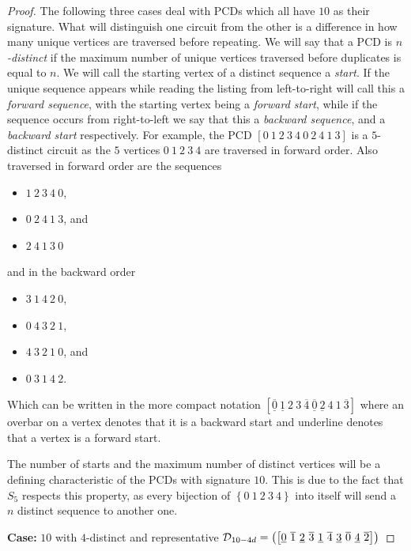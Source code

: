 \begin{proof}
The following three cases deal with PCDs which all have $10$ as their signature. What will distinguish one circuit from the other is a difference in how many unique vertices are traversed before repeating. We will say that a PCD is {\em  $n$-distinct} if the maximum number of unique vertices traversed before duplicates is equal to $n$. We will call the starting vertex of a distinct sequence a {\em start}. If the unique sequence appears while reading the listing from left-to-right will call this a {\em forward sequence}, with the starting vertex being a {\em forward start}, while if the sequence occurs from right-to-left we say that this a {\em backward sequence}, and a {\em backward start} respectively. For example, the PCD $\left[0\ 1\ 2\ 3\ 4\ 0\ 2\ 4\ 1\ 3 \right]$ is a $5$-distinct circuit as the $5$ vertices $0\ 1\ 2\ 3\ 4$ are traversed in forward order. Also traversed in forward order are the sequences 
\begin{itemize}
\item $1\ 2\ 3\ 4\ 0$,
\item $0\ 2\ 4\ 1\ 3$, and 
\item $2\ 4\ 1\ 3\ 0$
\end{itemize}
\noindent
and in the backward order
\begin{itemize}
\item $3\ 1\ 4\ 2\ 0$, 
\item $0\ 4\ 3\ 2\ 1$,
\item $4\ 3\ 2\ 1\ 0$, and
\item $0\ 3\ 1\ 4\ 2$.
\end{itemize}
\noindent
Which can be written in the more compact notation $\left[\overline{\underline{0}}\ \underline{1}\ 2\ 3\ \overline{4}\ \overline{\underline{0}}\ \underline{2}\ 4\ 1\ \overline{3} \right]$ where an overbar on a vertex denotes that it is a backward start and underline denotes that a vertex is a forward start.

The number of starts and the maximum number of distinct vertices will be a defining characteristic of the PCDs with signature $10$. This is due to the fact that $S_5$ respects this property, as every bijection of $\left\{0\ 1\ 2\ 3\ 4\right\}$ into itself will send a $n$ distinct sequence to another one.

\vspace{2ex}
\noindent
{\bf Case:} $10$ with $4$-distinct and representative $\pcd_{10-4d} = \left(\left[\underline{0}\ \overline{1}\ \underline{2}\ \overline{3}\ \underline{1}\ \overline{4}\ \underline{3}\ \overline{0}\ \underline{4}\ \overline{2} \right]\right)$
\vspace{2ex}


\end{proof}
